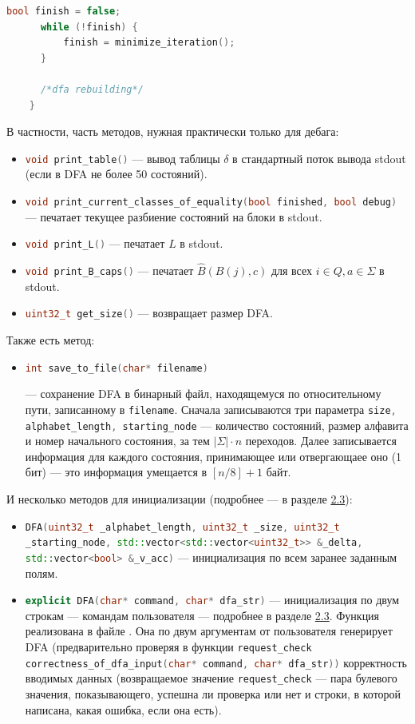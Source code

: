 \documentclass{article}
\begin{document}
\begin{itemize}
\begin{lstlisting}[language=C++]
      bool finish = false;
      while (!finish) {
          finish = minimize_iteration();
      }

      /*dfa rebuilding*/
    }
  \end{lstlisting}
\end{itemize}
В частности, часть методов, нужная практически только для дебага:
\begin{itemize}
\item[\ding{228}] \lstinline[language=C++]!void print_table()! --- вывод таблицы $\delta$ в стандартный поток вывода stdout (если в DFA не более 50 состояний).
\item[\ding{228}] \lstinline[language=C++]!void print_current_classes_of_equality(bool finished, bool debug)! --- печатает текущее разбиение состояний на блоки в stdout.
\item[\ding{228}] \lstinline[language=C++]!void print_L()! --- печатает $L$ в stdout.
\item[\ding{228}] \lstinline[language=C++]!void print_B_caps()! --- печатает $\hat B(B(j), c)$ для всех $i \in Q, a \in \Sigma$ в stdout.
\item[\ding{228}] \lstinline[language=C++]!uint32_t get_size()! --- возвращает размер DFA.
\end{itemize}
Также есть метод:
\begin{itemize}
  \item[\ding{228}] \hypertarget{p2}{\lstinline[language=C++]!int save_to_file(char* filename)!} --- сохранение DFA в бинарный файл, находящемуся по относительному пути, записанному в \lstinline[language=C++]!filename!. Сначала записываются три параметра \lstinline[language=C++]!size, alphabet_length, starting_node! --- количество состояний, размер алфавита и номер начального состояния, за тем $|\Sigma| \cdot n$ переходов. Далее записывается информация для каждого состояния, принимающее или отвергающаее оно (1 бит) --- это информация умещается в $[n/8] + 1$ байт. 
\end{itemize}
И несколько методов для инициализации (подробнее --- в разделе \hyperlink{p1}{2.3}):
\begin{itemize}
  \item[\ding{228}] \lstinline[language=C++]!DFA(uint32_t _alphabet_length, uint32_t _size, uint32_t _starting_node, std::vector<std::vector<uint32_t>> &_delta, std::vector<bool> &_v_acc)! --- инициализация по всем заранее заданным полям.
  \item[\ding{228}] \lstinline[language=C++]!explicit DFA(char* command, char* dfa_str)! --- инициализация по двум строкам --- командам пользователя --- подробнее в разделе \hyperlink{p1}{2.3}. Функция реализована в файле . Она по двум аргументам от пользователя генерирует DFA (предварительно проверяя в функции \lstinline[language=C++]!request_check correctness_of_dfa_input(char* command, char* dfa_str))! корректность вводимых данных (возвращаемое значение \lstinline[language=C++]!request_check! --- пара булевого значения, показывающего, успешна ли проверка или нет и строки, в которой написана, какая ошибка, если она есть).
  \end{itemize}
\end{document}
